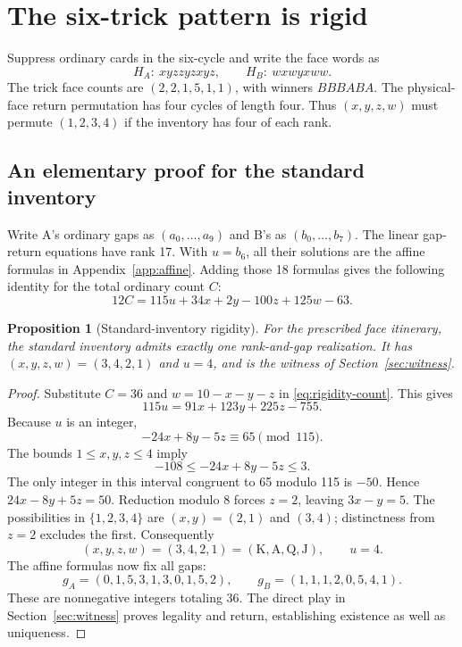 \documentclass[11pt]{article}
\newtheorem{proposition}{Proposition}
\newcommand{\JJ}{\mathrm J}
\newcommand{\QQ}{\mathrm Q}
\newcommand{\KK}{\mathrm K}
\renewcommand{\AA}{\mathrm A}
\begin{document}
\section{The six-trick pattern is rigid}\label{sec:rigidity}

Suppress ordinary cards in the six-cycle and write the face words as
\[
H_A:\ xyzzyzxyz,\qquad H_B:\ wxwyxww.
\]
The trick face counts are $(2,2,1,5,1,1)$, with winners $BBBABA$. The
physical-face return permutation has four cycles of length four. Thus
$(x,y,z,w)$ must permute $(1,2,3,4)$ if the inventory has four of each rank.

\subsection{An elementary proof for the standard inventory}

Write A's ordinary gaps as $(a_0,\ldots,a_9)$ and B's as
$(b_0,\ldots,b_7)$. The linear gap-return equations have rank 17. With
$u=b_6$, all their solutions are the affine formulas in
Appendix~\ref{app:affine}. Adding those 18 formulas gives the following
identity for the total ordinary count $C$:
\begin{equation}\label{eq:rigidity-count}
12C=115u+34x+2y-100z+125w-63.
\end{equation}

\begin{proposition}[Standard-inventory rigidity]\label{prop:rigidity}
For the prescribed face itinerary, the standard inventory admits exactly one
rank-and-gap realization. It has $(x,y,z,w)=(3,4,2,1)$ and $u=4$, and is
the witness of Section~\ref{sec:witness}.
\end{proposition}
\begin{proof}
Substitute $C=36$ and $w=10-x-y-z$ in \eqref{eq:rigidity-count}. This gives
\[
115u=91x+123y+225z-755.
\]
Because $u$ is an integer,
\[
-24x+8y-5z\equiv65\pmod{115}.
\]
The bounds $1\le x,y,z\le4$ imply
\[
-108\le-24x+8y-5z\le3.
\]
The only integer in this interval congruent to 65 modulo 115 is $-50$.
Hence $24x-8y+5z=50$. Reduction modulo 8 forces $z=2$, leaving
$3x-y=5$. The possibilities in $\{1,2,3,4\}$ are $(x,y)=(2,1)$ and
$(3,4)$; distinctness from $z=2$ excludes the first. Consequently
\[
\boxed{(x,y,z,w)=(3,4,2,1)=(\KK,\AA,\QQ,\JJ),\qquad u=4.}
\]
The affine formulas now fix all gaps:
\[
g_A=(0,1,5,3,1,3,0,1,5,2),\qquad
g_B=(1,1,1,2,0,5,4,1).
\]
These are nonnegative integers totaling 36. The direct play in
Section~\ref{sec:witness} proves legality and return, establishing existence
as well as uniqueness.
\end{proof}
\end{document}

